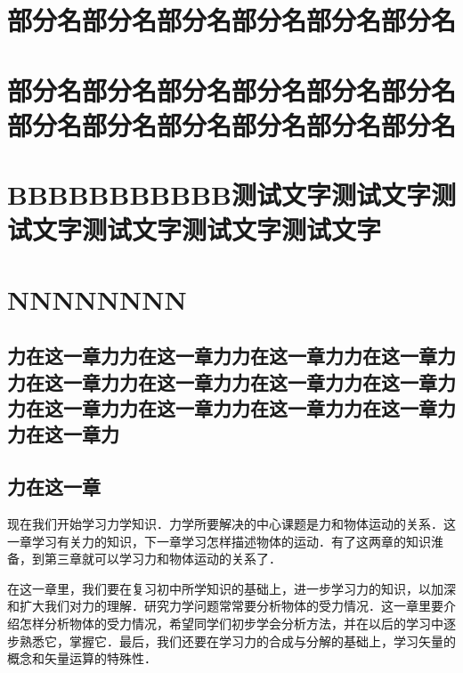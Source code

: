 


\partintro{\zhlipsum[1]}
\part[部分名]{部分名部分名部分名部分名部分名部分名}
\lipsum[1]

\part*[PLUSPLUSPLUSPLUS-PLUSPLUSPLUSPLUS-PLUSPLUSPLUSPLUS-PLUSPLUSPLUSPLUS]{部分名部分名部分名部分名部分名部分名部分名部分名部分名部分名部分名部分名}
\lipsum[1]


\part*[测试文字文字测试文字文字测试文字文字测试文字文字测试文字文字测试文字文字测试文字文字测试文字文字]{BBBBBBBBBBB测试文字测试文字测试文字测试文字测试文字测试文字}
\lipsum[1]



\part*[超长测试文字超长测试文字超长测试文字超长测试文字]{NNNNNNNN}
\lipsum

\chapter{力在这一章力力在这一章力力在这一章力力在这一章力力在这一章力力在这一章力力在这一章力力在这一章力力在这一章力力在这一章力力在这一章力力在这一章力力在这一章力}


\chapter{力在这一章}


现在我们开始学习力学知识．力学所要解决的中心课题是力和物体运动的关系．这一章学习有关力的知识，下一章学习怎样描述物体的运动．有了这两章的知识淮备，到第三章就可以学习力和物体运动的关系了．

在这一章里，我们要在复习初中所学知识的基础上，进一步学习力的知识，以加深和扩大我们对力的理解．研究力学问题常常要分析物体的受力情况．这一章里要介绍怎样分析物体的受力情况，希望同学们初步学会分析方法，并在以后的学习中逐步熟悉它，掌握它．最后，我们还要在学习力的合成与分解的基础上，学习矢量的概念和矢量运算的特殊性．


